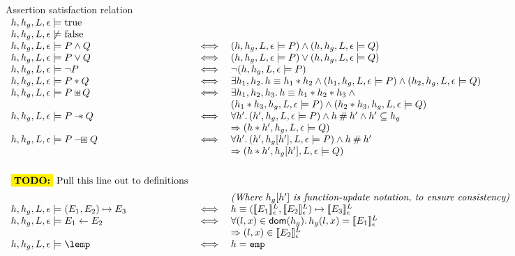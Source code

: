 \documentclass[a4paper]{article}
\begin{document}
\begin{display}{Assertion satisfaction relation}
  $\begin{array}{lcl}
    h,h_g,L,\env \satisfies \true \\
    h,h_g,L,\env \not\satisfies \false \\
    h,h_g,L,\env \satisfies P \land Q & \iff & (h,h_g,L,\env \satisfies
      P) \land (h,h_g,L,\env \satisfies Q) \\
    h,h_g,L,\env \satisfies P \lor Q & \iff & (h,h_g,L,\env \satisfies
      P) \lor (h,h_g,L,\env \satisfies Q) \\
    h,h_g,L,\env \satisfies \lnot P & \iff & \lnot(h,h_g,L,\env
      \satisfies P)\\
    h,h_g,L,\env \satisfies P \sep Q & \iff & \exists h_1,h_2 \st h \equiv h_1
      \sep h_2 \land (h_1,h_g,L,\env \satisfies P) \land (h_2,h_g,L,\env
      \satisfies Q) \\
    h,h_g,L,\env \satisfies P \sepish Q & \iff & \exists h_1,h_2,h_3 \st
      h \equiv h_1 \disju h_2 \disju h_3 \land {} \\
      && (h_1 \disju h_3, h_g, L, \env \satisfies P) \land
      (h_2 \disju h_3, h_g, L, \env \satisfies Q) \\
    h,h_g,L,\env \satisfies P \wand Q & \iff & \forall h' \st
      (h',h_g,L,\env \satisfies P) \land h \disj h' \land h' \subseteq h_g  \\
      & & \impl (h \disju h', h_g, L, \env \satisfies Q) \\
    h,h_g,L,\env \satisfies P \boxwand Q & \iff &
      \forall h' \st (h',h_g[h'],L,\env \satisfies P) \land h \disj h' \\
      & & \impl (h \disju h', h_g[h'], L, \env \satisfies Q) \\
    \TODO{Pull this line out to definitions}
      & & \text{\emph{(Where $h_g[h']$ is function-update notation, to ensure
          consistency)}} \\
    h,h_g,L,\env \satisfies (E_1,E_2) \pointsto E_3 & \iff &
      h \equiv (\evalle{E_1}, \evalle{E_2}) \pointsto \evalle{E_3} \\
    h,h_g,L,\env \satisfies E_1 \bp E_2 & \iff & \forall (l,x) \in \dom(h_g) \st
      h_g(l,x) = \evalle{E_1} \\
      & & \impl (l,x) \in \evalle{E_2} \\
    h,h_g,L,\env \satisfies \lemp & \iff & h = \emp
  \end{array}$
\end{display}
\end{document}
